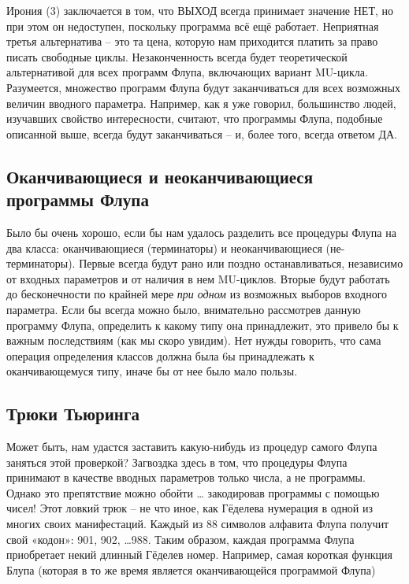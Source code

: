 \documentclass[../main.tex]{subfiles}
\begin{document}
Ирония (3) заключается в том, что ВЫХОД всегда принимает значение НЕТ, но при этом он недоступен, поскольку программа всё ещё работает. Неприятная третья альтернатива \--- это та цена, которую нам приходится платить за право писать свободные циклы. Незаконченность всегда будет теоретической альтернативой для всех программ Флупа, включающих вариант MU-цикла. Разумеется, множество программ Флупа будут заканчиваться для всех возможных величин вводного параметра. Например, как я уже говорил, большинство людей, изучавших свойство интересности, считают, что программы Флупа, подобные описанной выше, всегда будут заканчиваться \--- и, более того, всегда ответом ДА.


\subsection{Оканчивающиеся и неоканчивающиеся программы Флупа}

Было бы очень хорошо, если бы нам удалось разделить все процедуры Флупа на два класса: оканчивающиеся (терминаторы) и неоканчивающиеся (не-терминаторы). Первые всегда будут рано или поздно останавливаться, независимо от входных параметров и от наличия в нем MU-циклов. Вторые будут работать до бесконечности по крайней мере \emph{при одном} из возможных выборов входного параметра. Если бы всегда можно было, внимательно рассмотрев данную программу Флупа, определить к какому типу она принадлежит, это привело бы к важным последствиям (как мы скоро увидим). Нет нужды говорить, что сама операция определения классов должна была 6ы принадлежать к оканчивающемуся типу, иначе бы от нее было мало пользы.


\subsection{Трюки Тьюринга}

Может быть, нам удастся заставить какую-нибудь из процедур самого Флупа заняться этой проверкой? Загвоздка здесь в том, что процедуры Флупа принимают в качестве вводных параметров только числа, а не программы. Однако это препятствие можно обойти \ldots{} закодировав программы с помощью чисел! Этот ловкий трюк \--- не что иное, как Гёделева нумерация в одной из многих своих манифестаций. Каждый из 88 символов алфавита Флупа получит свой «кодон»: 901, 902, \ldots988. Таким образом, каждая программа Флупа приобретает некий длинный Гёделев номер. Например, самая короткая функция Блупа (которая в то же время является оканчивающейся программой Флупа)
\end{document}
